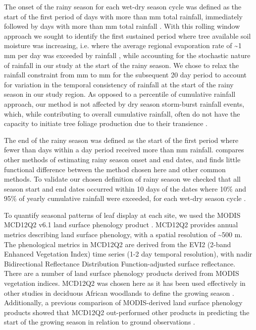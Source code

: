 \documentclass[11pt,a4paper]{article}
\begin{document}
The onset of the rainy season for each wet-dry season cycle was defined as the
start of the first period of \onsetPeriodOne{} days with more than
\onsetPrecipOne{} mm total rainfall, immediately followed by \onsetPeriodTwo{}
days with more than \onsetPrecipTwo{} mm total rainfall \citep{Tadross2005}. With this rolling
window approach we sought to identify the first sustained period where tree
available soil moisture was increasing, i.e. where the average regional
evaporation rate of \textasciitilde{}1 mm per day was exceeded by rainfall
\citep{Campbell1996}, while accounting for the stochastic nature of rainfall in
our study at the start of the rainy season. We chose to relax the rainfall
constraint from \onsetPrecipOne{} mm to \onsetPrecipTwo{} mm for the subsequent
20 day period to account for variation in the temporal consistency of rainfall
at the start of the rainy season in our study region. As opposed to a
percentile of cumulative rainfall approach, our method is not affected by dry
season storm-burst rainfall events, which, while contributing to overall
cumulative rainfall, often do not have the capacity to initiate tree foliage
production due to their transience \citep{February2016}. 

The end of the rainy season was defined as the start of the first period where
fewer than \numberstringnum{\rainyDaysEnd} days within a \periodEnd{} day
period received more than \rainyDef{} mm rainfall. \citet{Guan2014} compares
other methods of estimating rainy season onset and end dates, and finds little
functional difference between the method chosen here and other common methods.
To validate our chosen definition of rainy season we checked that all season
start and end dates occurred within 10 days of the dates where 10\% and 95\% of
yearly cumulative rainfall were exceeded, for each wet-dry season cycle
\citep{Adole2018a}. 

To quantify seasonal patterns of leaf display at each site, we used the MODIS
MCD12Q2 v6.1 land surface phenology product \citep{MCD12Q2}. MCD12Q2 provides
annual metrics describing land surface phenology, with a spatial resolution of
\textasciitilde{}500 m. The phenological metrics in MCD12Q2 are derived from
the EVI2 (2-band Enhanced Vegetation Index) time series (1-2 day temporal resolution), with nadir Bidirectional Reflectance
Distribution Function-adjusted surface reflectance. There are a number of land
surface phenology products derived from MODIS vegetation indices. MCD12Q2 was
chosen here as it has been used effectively in other studies in deciduous
African woodlands to define the growing season \citep{Begue2014, Adole2018b}.
Additionally, a previous comparison of MODIS-derived land surface phenology
products showed that MCD12Q2 out-performed other products in predicting the
start of the growing season in relation to ground observations
\citep{Peng2017}. 
\end{document}
